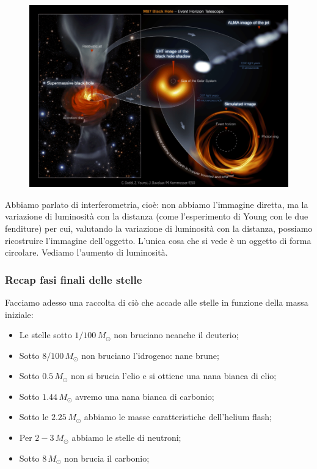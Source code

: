 \begin{figure}[H]
    \centering
    \includegraphics[width=12cm]{lezione 28 novembre/immaginericostruita.png}
    \label{lezione 28 novembre/immaginericostruita.png}
\end{figure}

Abbiamo parlato di interferometria, cioè: non abbiamo l'immagine diretta, ma la variazione di luminosità con la distanza (come l'esperimento di Young con le due fenditure) per cui, valutando la variazione di luminosità con la distanza, possiamo ricostruire l'immagine dell'oggetto. L'unica cosa che si vede è un oggetto di forma circolare. Vediamo l'aumento di luminosità. 

\subsubsection{Recap fasi finali delle stelle}
Facciamo adesso una raccolta di ciò che accade alle stelle in funzione della massa iniziale:

\begin{itemize}
    \item Le stelle sotto $1/100 \, M_{\odot}$ non bruciano neanche il deuterio;
    \item Sotto $8/100 \, M_{\odot}$ non bruciano l'idrogeno: nane brune;
    \item Sotto $0.5 \, M_{\odot}$ non si brucia l'elio e si ottiene una nana bianca di elio;
    \item Sotto $1.44 \, M_{\odot}$ avremo una nana bianca di carbonio;
    \item Sotto le $2.25 \, M_{\odot}$ abbiamo le masse caratteristiche dell'helium flash;
    \item Per $2-3 \, M_{\odot}$ abbiamo le stelle di neutroni;
    \item Sotto $8 \, M_{\odot}$ non brucia il carbonio;
\end{itemize}

